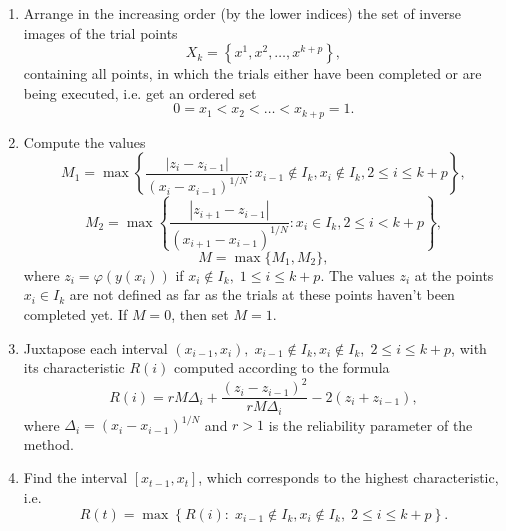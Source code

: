 \documentclass{svproc}
\begin{document}
\begin{enumerate} \item Arrange in the increasing order (by the lower indices) the set of inverse images of the trial points
	\begin{displaymath} 
		X_k=\left\{x^1,x^2,\ldots,x^{k+p}\right\}, 
	\end{displaymath} 
	containing all points, in which the trials either have been completed or are being executed, i.e. get an  ordered set 
	\begin{displaymath} 
		0=x_1<x_2<\ldots<x_{k+p}=1. 
	\end{displaymath} 
	
	\item Compute the values 
	\begin{displaymath} 
		M_1=\max{\left\{\frac{\left|z_i-z_{i-1}\right|}{\left(x_i-x_{i-1}\right)^{1/N}}:x_{i-1}\notin  I_k,x_i\notin I_k,2\le i\le k+p\right\}}, 
	\end{displaymath} 
	\begin{displaymath} 
		M_2=\max{\left\{\frac{\left|z_{i+1}-z_{i-1}\right|}{\left(x_{i+1}-x_{i-1}\right)^{1/N}}:x_i\in  I_k,2\le i<k+p\right\}}, 
	\end{displaymath} 
	\begin{displaymath} 
		M=\max{\{}M_1,M_2\}, 
	\end{displaymath} 
	where $ z_i=\varphi\left(y\left(x_i\right)\right)$ if $x_i\notin I_k,\;1\le i\le k+p$. The values $z_i$ at the points $x_i\in I_k$ are not defined as far as the trials at these points haven't been completed yet. If $M=0$, then set $M=1$.
	
	\item Juxtapose each interval $\left(x_{i-1},x_i\right),\;x_{i-1}\notin I_k,x_i\notin I_k,\;2\le i\le  k+p$, with its characteristic $R\left(i\right)$ computed according to the formula 
	\begin{displaymath} 
		R\left(i\right)=rM\Delta_i+\frac{\left(z_i-z_{i-1}\right)^2}{rM\Delta_i}-2\left(z_i+z_{i-1}\right), 
	\end{displaymath} 
	where $\Delta_i=\left(x_i-x_{i-1}\right)^{1/N}$ and $ r>1$ is the reliability parameter of the method.
	
	\item Find the interval $\left[x_{t-1},x_t\right]$, which corresponds to the highest characteristic, i.e.
	\begin{displaymath} 
		R\left(t\right)=\max{\left\{R\left(i\right):\;x_{i-1}\notin I_k,x_i\notin I_k,\;2\le i\le k+p\right\}}. 
	\end{displaymath} 
	

\end{enumerate}
\end{document}
